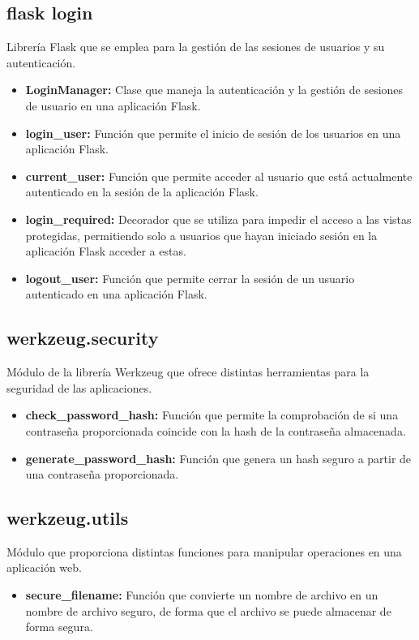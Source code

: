 \subsection{flask login} 
\cite{flask-login} Librería Flask que se emplea para la gestión de las sesiones de usuarios y su autenticación.

\begin{itemize}
    \item \textbf{LoginManager:} Clase que maneja la autenticación y la gestión de sesiones de usuario en una aplicación Flask. 
    \item \textbf{login\_user:} Función que permite el inicio de sesión de los usuarios en una aplicación Flask.
    \item \textbf{current\_user:} Función que permite acceder al usuario que está actualmente autenticado en la sesión de la aplicación Flask. 
    \item \textbf{login\_required:} Decorador que se utiliza para impedir el acceso a las vistas protegidas, permitiendo solo a usuarios que hayan iniciado sesión en la aplicación Flask acceder a estas. 
    \item \textbf{logout\_user:} Función que permite cerrar la sesión de un usuario autenticado en una aplicación Flask.
\end{itemize}

\subsection{werkzeug.security}
\cite{Werkzeug2} Módulo de la librería Werkzeug que ofrece distintas herramientas para la seguridad de las aplicaciones.
\begin{itemize}
    \item \textbf{check\_password\_hash:} Función que permite la comprobación de si una contraseña proporcionada coincide con la hash de la contraseña almacenada.
    \item \textbf{generate\_password\_hash:} Función que genera un hash seguro a partir de una contraseña proporcionada.
\end{itemize}

\subsection{werkzeug.utils}
\cite{Werkzeug} Módulo que proporciona distintas funciones para manipular operaciones en una aplicación web.
\begin{itemize}
    \item \textbf{secure\_filename:} Función que convierte un nombre de archivo en un nombre de archivo seguro, de forma que el archivo se puede almacenar de forma segura.
\end{itemize}

